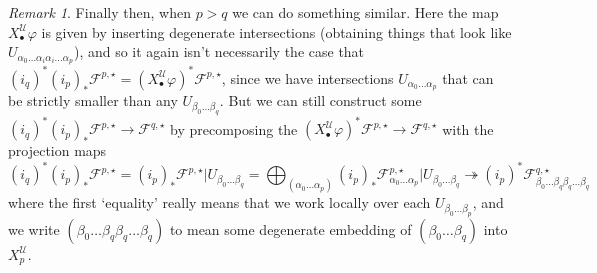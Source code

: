 \documentclass[11pt,fleqn]{article}
\theoremstyle{plain}
\theoremstyle{definition}
\theoremstyle{remark}
\newtheorem{remark}[theorem]{Remark}
\numberwithin{equation}{theorem}
\newcommand{\cover}{\mathcal{U}}
\newcommand{\anotherbullet}{\star}
\newcommand{\restricted}{\mathbin{\big\vert}}
\newcommand{\nerve}[1]{X_{#1}^\cover}
\begin{document}
\begin{remark}
            Finally then, when $p>q$ we can do something similar.
            Here the map $\nerve{\bullet}\varphi$ is given by inserting degenerate intersections (obtaining things that look like $U_{\alpha_0\ldots\alpha_i\alpha_i\ldots\alpha_p}$), and so it again isn't necessarily the case that $(i_q)^*(i_p)_*\mathcal{F}^{p,\anotherbullet} = (\nerve{\bullet}\varphi)^*\mathcal{F}^{p,\anotherbullet}$, since we have intersections $U_{\alpha_0\ldots\alpha_p}$ that can be strictly smaller than any $U_{\beta_0\ldots\beta_q}$.
            But we can still construct some $(i_q)^*(i_p)_*\mathcal{F}^{p,\anotherbullet} \to \mathcal{F}^{q,\anotherbullet}$ by precomposing the $(\nerve{\bullet}\varphi)^*\mathcal{F}^{p,\anotherbullet}\to\mathcal{F}^{q,\anotherbullet}$ with the projection maps
            \[
                (i_q)^*(i_p)_*\mathcal{F}^{p,\anotherbullet}
                =
                (i_p)_*\mathcal{F}^{p,\anotherbullet}\restricted U_{\beta_0\ldots\beta_q}
                =
                \bigoplus_{(\alpha_0\ldots\alpha_p)} (i_p)_*\mathcal{F}_{\alpha_0\ldots\alpha_p}^{p,\anotherbullet} \restricted U_{\beta_0\ldots\beta_q}
                \twoheadrightarrow
                (i_p)^*\mathcal{F}_{\beta_0\ldots\beta_q\beta_q\ldots\beta_q}^{q,\anotherbullet}
            \]
            where the first `equality' really means that we work locally over each $U_{\beta_0\ldots\beta_p}$, and we write $(\beta_0\ldots\beta_q\beta_q\ldots\beta_q)$ to mean some degenerate embedding of $(\beta_0\ldots\beta_q)$ into $\nerve{p}$.
        \end{remark}
\end{document}
